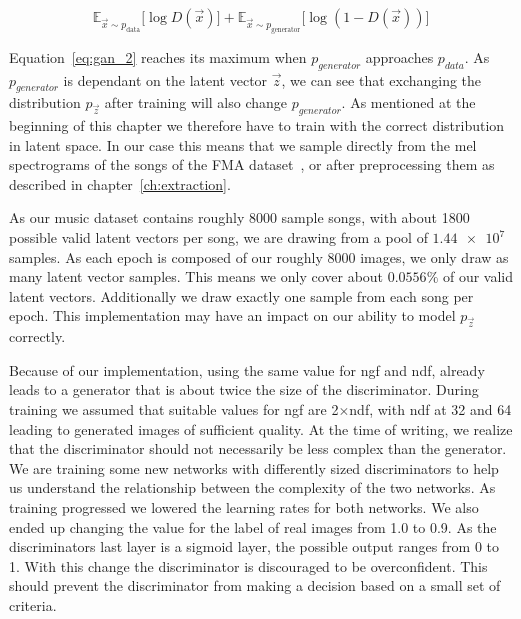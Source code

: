             \begin{equation}
                \mathbb{E}_{\vec{x} \sim p_{\text{data}}}
                    \bigl[ \log D(\vec{x}) \bigr] +
                \mathbb{E}_{\vec{x} \sim p_{\text{generator}}}
                    \bigl[ \log \left( 1 - D(\vec{x}) \right) \bigr]
                \label{eq:gan_2}
            \end{equation}

            Equation~\ref{eq:gan_2} reaches its maximum when $p_{generator}$ approaches $p_{data}$. As $p_{generator}$ is dependant on the latent vector $\vec{z}$, we can see that exchanging the distribution $p_{\vec{z}}$ after training will also change $p_{generator}$. As mentioned at the beginning of this chapter we therefore have to train with the correct distribution in latent space. In our case this means that we sample directly from the mel spectrograms of the songs of the FMA dataset~\cite{FMA}, or after preprocessing them as described in chapter~\ref{ch:extraction}.

            As our music dataset contains roughly 8000 sample songs, with about 1800 possible valid latent vectors per song, we are drawing from a pool of $\num{1.44e7}$ samples. As each epoch is composed of our roughly 8000 images, we only draw as many latent vector samples. This means we only cover about $0.0556\%$ of our valid latent vectors. Additionally we draw exactly one sample from each song per epoch. This implementation may have an impact on our ability to model $p_{\vec{z}}$ correctly.

            Because of our implementation, using the same value for ngf and ndf, already leads to a generator that is about twice the size of the discriminator. During training we assumed that suitable values for ngf are 2$\times$ndf, with ndf at 32 and 64 leading to generated images of sufficient quality. At the time of writing, we realize that the discriminator should not necessarily be less complex than the generator. We are training some new networks with differently sized discriminators to help us understand the relationship between the complexity of the two networks. As training progressed we lowered the learning rates for both networks. We also ended up changing the value for the label of real images from 1.0 to 0.9. As the discriminators last layer is a sigmoid layer, the possible output ranges from 0 to 1. With this change the discriminator is discouraged to be overconfident. This should prevent the discriminator from making a decision based on a small set of criteria.


